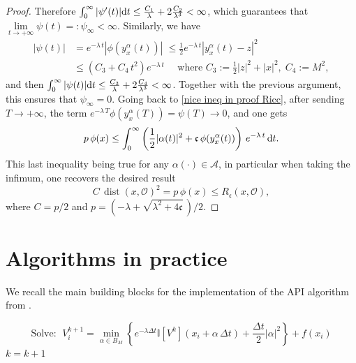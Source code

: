 \documentclass[12pt]{amsart}
\newcommand{\D}[1]{\mbox{\rm #1}}
\newcommand{\dd}{\D{d}}
\numberwithin{equation}{section}
\theoremstyle{plain}
\begin{document}
\begin{proof}
Therefore $\int_{0}^{\infty} |\psi'(t)|\dd t \leq \frac{C_{1}}{\lambda} + 2\frac{C_{2}}{\lambda^{3}}<\infty$, which guarantees that $\lim\limits_{t\to +\infty}\psi(t)=:\psi_{\infty}<\infty$. Similarly, we have
\begin{equation*}
\begin{aligned}
    |\psi(t)|
    & = e^{-\lambda\,t} |\phi(y_{x}^{\alpha}(t))| \; \leq \frac{1}{2}e^{-\lambda\,t} |y_{x}^{\alpha}(t) - z|^{2} \\
    & \leq (C_{3} + C_{4}\,t^{2})e^{-\lambda\,t} \quad \text{ where } C_{3} := \frac{1}{2}|z|^{2} + |x|^{2}, \; C_{4}:= M^{2} ,
\end{aligned}
\end{equation*}
and then $\int_{0}^{\infty} |\psi(t)|\dd t \leq \frac{C_{3}}{\lambda} + 2\frac{C_{4}}{\lambda^{3}}<\infty$. Together with the previous argument, this ensures that $\psi_{\infty}= 0$. Going back to \eqref{nice ineq in proof Ricc}, after sending $T\to +\infty$, the term $e^{-\lambda\,T}\phi(y_{x}^{\alpha}(T)) =\psi(T)\to 0$, and one gets
\begin{equation*}
    p\,\phi(x)  \leq \int_{0}^{\infty} \left(\frac{1}{2}|\alpha(t)|^{2} + \mathfrak{c}\,\phi(y_{x}^{\alpha}(t))\right)\,e^{-\lambda\,t}\,\dd t.
\end{equation*}
This last inequality being true for any $\alpha(\cdot)\in \mathcal{A}$, in particular when taking the infimum, one recovers the desired result
\begin{equation*}
    C\,\operatorname{dist}(x,\mathscr{O})^{2} = p\,\phi(x) \leq R_{\mathfrak{c}}(x,\mathscr{O}) ,
\end{equation*}
where $C=p/2$ and $p = (-\lambda + \sqrt{\lambda^{2} + 4\mathfrak{c}}\,)/2$.
\end{proof}


\section{Algorithms in practice}\label{app:algo}

We recall the main building blocks for the implementation of the API algorithm from \cite{alla2015efficient}.

\begin{algorithm}[H]\label{VI}
\SetAlgoLined
{}
{
    {
    \begin{equation*}
        \text{Solve: } \;V_i^{k+1} =\min_{\alpha \in B_M} \left\{ e^{-\lambda \Delta t} \mathds{I}\left[V^k\right]\left(x_i+\alpha\,\Delta t\right)+ \frac{\Delta t}{2}|\alpha|^{2} \right\} + f(x_i)
    \end{equation*}
    }
    $k=k+1$
}
\caption{Value Iteration for infinite horizon optimal control \textbf{(VI)}}
\end{algorithm}
\end{document}
